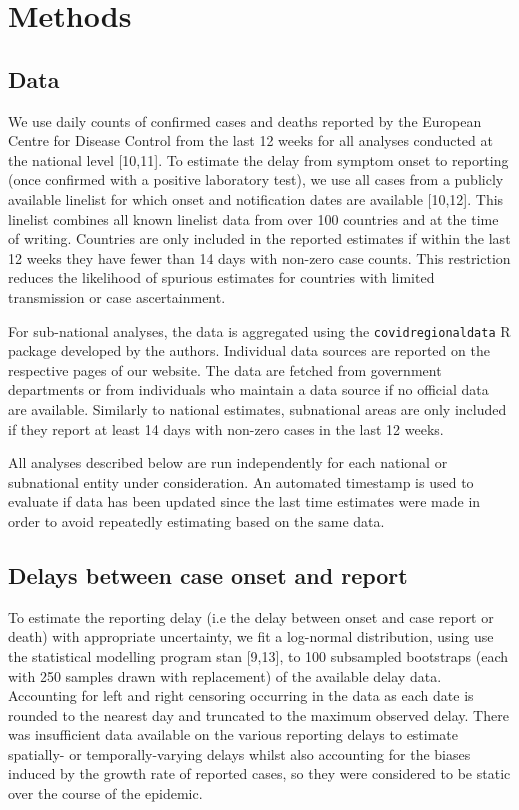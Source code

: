 \documentclass[
]{article}
\begin{document}
\hypertarget{methods}{%
\section{Methods}\label{methods}}

\hypertarget{data}{%
\subsection{Data}\label{data}}

We use daily counts of confirmed cases and deaths reported by the
European Centre for Disease Control from the last 12 weeks for all
analyses conducted at the national level {[}10,11{]}. To estimate the
delay from symptom onset to reporting (once confirmed with a positive
laboratory test), we use all cases from a publicly available linelist
for which onset and notification dates are available {[}10,12{]}. This
linelist combines all known linelist data from over 100 countries and at
the time of writing. Countries are only included in the reported
estimates if within the last 12 weeks they have fewer than 14 days with
non-zero case counts. This restriction reduces the likelihood of
spurious estimates for countries with limited transmission or case
ascertainment.

For sub-national analyses, the data is aggregated using the
\texttt{covidregionaldata} R package developed by the authors.
Individual data sources are reported on the respective pages of our
website. The data are fetched from government departments or from
individuals who maintain a data source if no official data are
available. Similarly to national estimates, subnational areas are only
included if they report at least 14 days with non-zero cases in the last
12 weeks.

All analyses described below are run independently for each national or
subnational entity under consideration. An automated timestamp is used
to evaluate if data has been updated since the last time estimates were
made in order to avoid repeatedly estimating based on the same data.

\hypertarget{delays-between-case-onset-and-report}{%
\subsection{Delays between case onset and
report}\label{delays-between-case-onset-and-report}}

To estimate the reporting delay (i.e the delay between onset and case
report or death) with appropriate uncertainty, we fit a log-normal
distribution, using use the statistical modelling program stan
{[}9,13{]}, to 100 subsampled bootstraps (each with 250 samples drawn
with replacement) of the available delay data. Accounting for left and
right censoring occurring in the data as each date is rounded to the
nearest day and truncated to the maximum observed delay. There was
insufficient data available on the various reporting delays to estimate
spatially- or temporally-varying delays whilst also accounting for the
biases induced by the growth rate of reported cases, so they were
considered to be static over the course of the epidemic.
\end{document}
